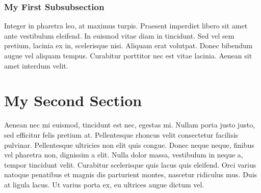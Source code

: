 \documentclass{report}
\begin{document}
	\subsubsection{My First Subsubsection}
	
	Integer in pharetra leo, at maximus turpis. Praesent imperdiet libero sit amet ante vestibulum eleifend. In euismod vitae diam in tincidunt. Sed vel sem pretium, lacinia ex in, scelerisque nisi. Aliquam erat volutpat. Donec bibendum augue vel aliquam tempus. Curabitur porttitor nec est vitae lacinia. Aenean sit amet interdum velit.
	
	\section*{My Second Section}  %
	
	Aenean nec mi euismod, tincidunt est nec, egestas mi. Nullam porta justo justo, sed efficitur felis pretium at. Pellentesque rhoncus velit consectetur facilisis pulvinar. Pellentesque ultricies non elit quis congue. Donec neque neque, finibus vel pharetra non, dignissim a elit. Nulla dolor massa, vestibulum in neque a, tempor tincidunt velit. Curabitur scelerisque quis lacus quis eleifend. Orci varius natoque penatibus et magnis dis parturient montes, nascetur ridiculus mus. Duis at ligula lacus. Ut varius porta ex, eu ultrices augue dictum vel.
\end{document}
